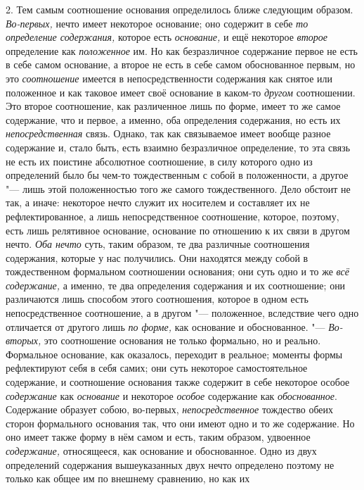 2. Тем самым соотношение основания определилось ближе следующим образом.
{\em Во-первых,} нечто имеет некоторое основание; оно
содержит в себе {\em то определение содержания,}
которое есть {\em основание,} и ещё некоторое
{\em второе} определение как
{\em положенное} им. Но как безразличное содержание
первое не есть в себе самом основание, а второе не есть в себе самом
обоснованное первым, но это {\em соотношение} имеется в
непосредственности содержания как снятое или положенное и как таковое имеет
своё основание в каком-то {\em другом} соотношении. Это
второе соотношение, как различенное лишь по форме, имеет то же самое
содержание, что и первое, а именно, оба определения содержания, но есть их
{\em непосредственная} связь. Однако, так как
связываемое имеет вообще разное содержание и, стало быть, есть взаимно
безразличное определение, то эта связь не есть их поистине абсолютное
соотношение, в силу которого одно из определений было бы чем-то
тождественным с собой в положенности, а другое "--- лишь этой положенностью
того же самого тождественного. Дело обстоит не так, а иначе: некоторое
нечто служит их носителем и составляет их не рефлектированное, а лишь
непосредственное соотношение, которое, поэтому, есть лишь релятивное
основание, основание по отношению к их связи в другом нечто.
{\em Оба нечто} суть, таким образом, те два различные
соотношения содержания, которые у нас получились. Они находятся между собой
в тождественном формальном соотношении основания; они суть одно и то же
{\em всё содержание,} а именно, те два определения
содержания и их соотношение; они различаются лишь способом этого
соотношения, которое в одном есть непосредственное соотношение, а в другом
"--- положенное, вследствие чего одно отличается от другого лишь
{\em по форме,} как основание и обоснованное. "---
{\em Во-вторых,} это соотношение основания не только
формально, но и реально. Формальное основание, как оказалось, переходит в
реальное; моменты формы рефлектируют себя в себя самих; они суть некоторое
самостоятельное содержание, и соотношение основания также содержит в себе
некоторое особое {\em содержание} как {\em основание} и некоторое
{\em особое} содержание как {\em обоснованное}. Содержание образует собою,
во-первых, {\em непосредственное} тождество обеих
сторон формального основания так, что они имеют одно и то же содержание. Но
оно имеет также форму в нём самом и есть, таким образом, удвоенное
{\em содержание,} относящееся, как основание и
обоснованное. Одно из двух определений содержания вышеуказанных двух нечто
определено поэтому не только как общее им по внешнему сравнению, но как их
